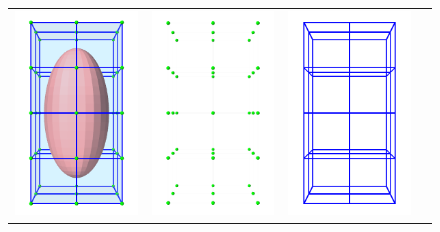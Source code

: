 \begin{figure}[ht]
	\centering
	\begin{tabular}{cccc}
	\includegraphics[width=\imglength]{images/fem_embedded} & 
	\includegraphics[width=\imglength]{images/fem_embedded_nodes} &
	\includegraphics[width=\imglength]{images/fem_embedded_elements} &

\end{tabular}
\end{figure}

